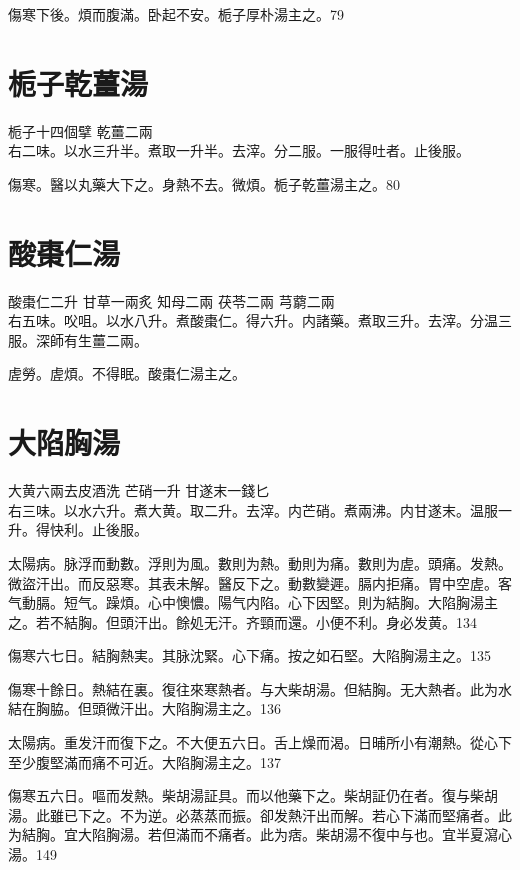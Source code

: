 傷寒下後。煩而腹滿。卧起不安。栀子厚朴湯主之。79

\section{栀子乾薑湯}

栀子{\scriptsize 十四個擘} 乾薑{\scriptsize 二兩}\\
右二味。以水三升半。煮取一升半。去滓。分二服。一服得吐者。止後服。

傷寒。醫以丸藥大下之。身熱不去。微煩。栀子乾薑湯主之。80

\section{酸棗{\khaaitp 仁}湯}

酸棗仁{\scriptsize 二升} 甘草{\scriptsize 一兩炙} 知母{\scriptsize 二兩} 茯苓{\scriptsize 二兩} 芎藭{\scriptsize 二兩}\\
右五味。㕮咀。以水八升。煮酸棗仁。得六升。内諸藥。煮取三升。去滓。分温三服。{\scriptsize 深師有生薑二兩。}

虗勞。虗煩。不得眠。酸棗{\khaaitp 仁}湯主之。

\section{大陷胸湯}

大黄{\scriptsize 六兩去皮酒洗} 芒硝{\scriptsize 一升} 甘遂末{\scriptsize 一錢匕}\\
右三味。以水六升。煮大黄。取二升。去滓。内芒硝。煮兩沸。内甘遂末。温服一升。得快利。止後服。

太陽病。脉浮而動數。浮則为風。數則为熱。動則为痛。數則为虗。頭痛。发熱。微盜汗出。而反惡寒。其表未解。醫反下之。動數變遲。膈内拒痛。胃中空虗。客气動膈。短气。躁煩。心中懊憹。陽气内陷。心下因堅。則为結胸。大陷胸湯主之。若不結胸。但頭汗出。餘処无汗。齐頸而還。小便不利。身必发黄。134

傷寒六七日。結胸熱実。其脉沈緊。心下痛。按之如石堅。大陷胸湯主之。135

傷寒十餘日。熱結在裏。復往來寒熱者。与大柴胡湯。但結胸。无大熱者。此为水結在胸脇。{\khaaitp 但}頭微汗出。大陷胸湯主之。136

太陽病。重发汗而復下之。不大便五六日。舌上燥而渴。日晡所小有潮熱。從心下至少腹堅滿而痛不可近。大陷胸湯主之。137

傷寒五六日。嘔而发熱。柴胡湯証具。而以他藥下之。柴胡証仍在者。復与柴胡湯。此雖已下之。不为逆。必蒸蒸而振。卻发熱汗出而解。若心下滿而堅痛者。此为結胸。宜大陷胸湯。若但滿而不痛者。此为痞。柴胡{\khaaitp 湯}不復中与也。宜半夏瀉心湯。149

